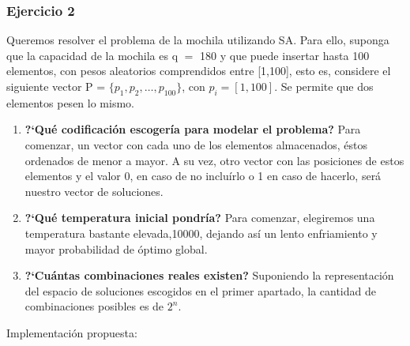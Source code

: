 \documentclass{llncs}
\begin{document}
\subsubsection*{Ejercicio 2}
Queremos resolver el problema de la mochila utilizando SA. Para ello, suponga que la capacidad de la mochila es q $=$ 180 y que puede insertar hasta 100 elementos, con pesos aleatorios comprendidos entre [1,100], esto es, considere el siguiente vector P = $\lbrace p_1, p_2, \dots , p_{100}\rbrace$, con $p_i = [1,100]$. Se permite que dos elementos pesen lo mismo. \\

\begin{enumerate}
\item \textbf{?`Qu\'{e} codificaci\'{o}n escoger\'{i}a para modelar el problema?} Para comenzar, un vector con cada uno de los elementos almacenados, \'{e}stos ordenados de menor a mayor. A su vez, otro vector con las posiciones de estos elementos y el valor 0, en caso de no inclu\'{i}rlo o 1 en caso de hacerlo, ser\'{a} nuestro vector de soluciones. 
\item \textbf{?`Qu\'{e} temperatura inicial pondr\'{i}a?} Para comenzar, elegiremos una temperatura bastante elevada,10000, dejando as\'{i} un lento enfriamiento y mayor probabilidad de \'{o}ptimo global.
\item \textbf{?`Cu\'{a}ntas combinaciones reales existen?} Suponiendo la representaci\'{o}n del espacio de soluciones escogidos en el primer apartado, la cantidad de combinaciones posibles es de $2^n$.
\end{enumerate}

Implementaci\'{o}n propuesta:\\
\end{document}
